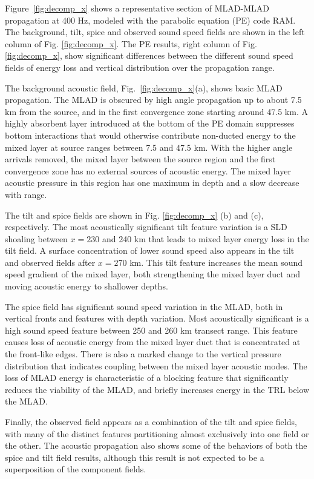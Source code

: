 \documentclass[preprint,NumberedRefs]{JASA}
\begin{document}
Figure~\ref{fig:decomp_x} shows a representative section of MLAD-MLAD propagation at 400 Hz, modeled with the parabolic equation (PE) code RAM\citep{collins93}. The background, tilt, spice and observed sound speed fields are shown in the left column of Fig. \ref{fig:decomp_x}. The PE results, right column  of Fig. \ref{fig:decomp_x}, show significant differences between the different sound speed fields of energy loss and vertical distribution over the propagation range.

The background acoustic field, Fig.~\ref{fig:decomp_x}(a), shows basic MLAD propagation. The MLAD is obscured by high angle propagation up to about 7.5 km from the source, and in the first convergence zone starting around 47.5 km. A highly absorbent layer introduced at the bottom of the PE domain suppresses bottom interactions that would otherwise contribute non-ducted energy to the mixed layer at source ranges between 7.5 and 47.5 km. With the higher angle arrivals removed, the mixed layer between the source region and the first convergence zone has no external sources of acoustic energy. The mixed layer acoustic pressure in this region has one maximum in depth and a slow decrease with range.

The tilt and spice fields are shown in Fig. \ref{fig:decomp_x} (b) and (c), respectively. The most acoustically significant tilt feature variation is a SLD shoaling between $x=230$ and 240 km that leads to mixed layer energy loss in the tilt field. A surface concentration of lower sound speed also appears in the tilt and observed fields after $x=270$ km. This tilt feature increases the mean sound speed gradient of the mixed layer, both strengthening the mixed layer duct and moving acoustic energy to shallower depths.

The spice field has significant sound speed variation in the MLAD, both in vertical fronts and features with depth variation. Most acoustically significant is a high sound speed feature between 250 and 260 km transect range. This feature causes loss of acoustic energy from the mixed layer duct that is concentrated at the front-like edges. There is also a marked change to the vertical pressure distribution that indicates coupling between the mixed layer acoustic modes. The loss of MLAD energy is characteristic of a blocking feature that significantly reduces the viability of the MLAD, and briefly increases energy in the TRL below the MLAD.

Finally, the observed field appears as a combination of the tilt and spice fields, with many of the distinct features partitioning almost exclusively into one field or the other. The acoustic propagation also shows some of the behaviors of both the spice and tilt field results, although this result is not expected to be a superposition of the component fields.
\end{document}
